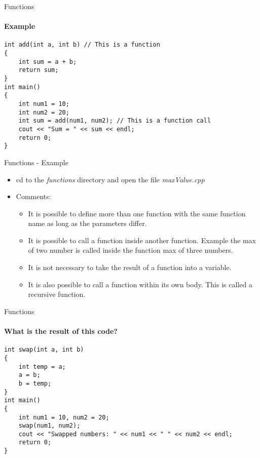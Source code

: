 \documentclass[aspectratio=169]{beamer}
\begin{document}
\begin{frame}[fragile]{Functions}
    \framesubtitle{Example}
    \begin{lstlisting}
int add(int a, int b) // This is a function
{
    int sum = a + b;
    return sum;
}
int main()
{
    int num1 = 10;
    int num2 = 20;
    int sum = add(num1, num2); // This is a function call
    cout << "Sum = " << sum << endl;
    return 0;
}
    \end{lstlisting}
\end{frame}

\begin{frame}[fragile]{Functions - Example}
    \begin{itemize}
        \item cd to the \textit{functions} directory and open the file \textit{maxValue.cpp}
        \item Comments:
        \begin{itemize}
            \item It is possible to define more than one function with the same function name as long as the parameters differ.
            \item It is possible to call a function inside another function. Example the max of two number is called inside the function max of three numbers.
            \item It is not necessary to take the result of a function into a variable.
            \item It is also possible to call a function within its own body. This is called a recursive function.
        \end{itemize}
    \end{itemize}
\end{frame}

\begin{frame}[fragile]{Functions}
    \framesubtitle{What is the result of this code?}

    \begin{lstlisting}
int swap(int a, int b)
{
    int temp = a;
    a = b;
    b = temp;
}
int main()
{
    int num1 = 10, num2 = 20;
    swap(num1, num2);
    cout << "Swapped numbers: " << num1 << " " << num2 << endl;
    return 0;
}
    \end{lstlisting}
\end{frame}
\end{document}
